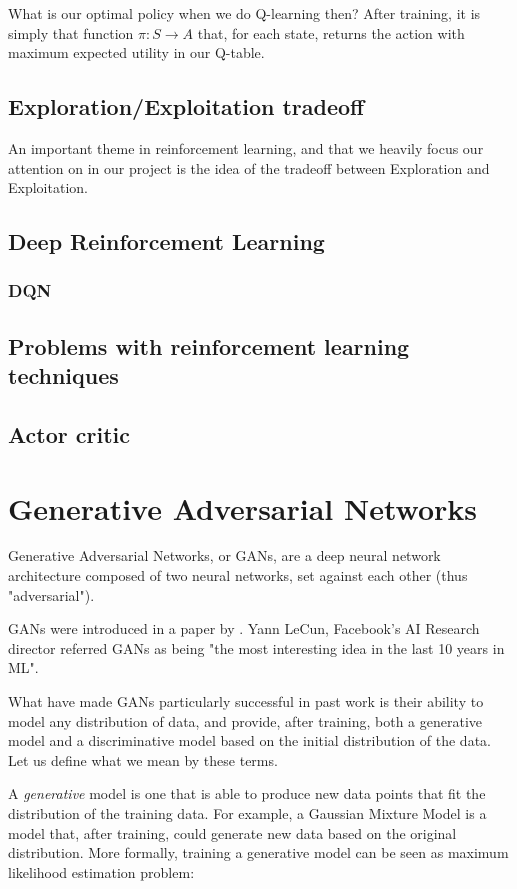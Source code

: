 What is our optimal policy when we do Q-learning then? After training, it is simply that function $\pi: S \to A$ that, for each state, returns the action with maximum expected utility in our Q-table.

\subsection{Exploration/Exploitation tradeoff}
An important theme in reinforcement learning, and that we heavily focus our attention on in our project is the idea of the tradeoff between Exploration and Exploitation.

\subsection{Deep Reinforcement Learning}
\subsubsection{DQN}
\subsection{Problems with reinforcement learning techniques}
\subsection{Actor critic}


\section{Generative Adversarial Networks}
\label{sec:gan}
Generative Adversarial Networks, or GANs, are a deep neural network architecture composed of two neural networks, set against each other (thus "adversarial").

GANs were introduced in a paper by \cite{goodfellow2014generative}. Yann LeCun, Facebook's AI Research director referred GANs as being "the most interesting idea in the last 10 years in ML".

What have made GANs particularly successful in past work is their ability to model any distribution of data, and provide, after training, both a generative model and a discriminative model based on the initial distribution of the data. Let us define what we mean by these terms.

A \textit{generative} model is one that is able to produce new data points that fit the distribution of the training data. For example, a Gaussian Mixture Model is a model that, after training, could generate new data based on the original distribution. More formally, training a generative model can be seen as maximum likelihood estimation problem:

